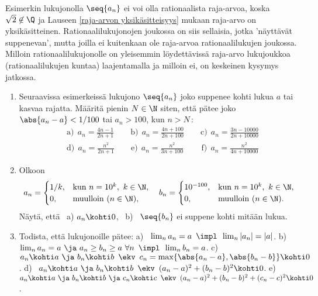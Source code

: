 Esimerkin lukujonolla $\seq{a_n}$ ei voi olla rationaalista raja-arvoa, koska 
$\sqrt{2}\not\in\Q$ ja Lauseen \ref{raja-arvon yksikäsitteisyys} mukaan raja-arvo on
yksikäsitteinen. Rationaalilukujonojen joukossa on siis sellaisia, jotka 
'näyttävät suppenevan', mutta joilla ei kuitenkaan ole raja-arvoa rationaalilukujen
joukossa. Milloin rationaalilukujonolle on yleisemmin löydettävissä raja-arvo 
lukujoukkoa (rationaalilukujen kuntaa) laajentamalla ja milloin ei, on keskeinen kysymys
jatkossa.

\Harj
\begin{enumerate}

\item
Seuraavissa esimerkeissä lukujono $\seq{a_n}$ joko suppenee kohti lukua $a$ tai kasvaa
rajatta. Määritä pienin $N\in\N$ siten, että pätee joko $\abs{a_n-a}<1/100$ tai $a_n>100$,
kun $n>N$\,:
\begin{align*}
&\text{a)}\ \ a_n = \frac{4n-1}{2n+1} \qquad 
 \text{b)}\ \ a_n = \frac{4n+100}{2n+100} \qquad
 \text{c)}\ \ a_n = \frac{3n-10000}{2n+10000} \\
&\text{d)}\ \ a_n = \frac{n^2}{2n+1} \qquad 
 \text{e)}\ \ a_n = \frac{n^2}{3n+100} \qquad\,
 \text{f)}\ \ a_n = \frac{n^2}{4n+10000}
\end{align*}

\item
Olkoon
\[
a_n = \begin{cases} 1/k, &\text{kun}\ n=10^k,\ k\in\N, \\
                    0,   &\text{muulloin ($n\in\N$)},
      \end{cases} \quad
b_n = \begin{cases} 10^{-100}, &\text{kun}\ n=10^k,\ k\in\N, \\
                    0,         &\text{muulloin ($n\in\N$)}.
      \end{cases}
\]
Näytä, että \ a) $a_n \kohti 0$, \ b) \ $\seq{b_n}$ ei suppene kohti mitään lukua.

\item \label{H-I-6: lukujonopari}
Todista, että lukujonoille pätee: \vspace{1mm}\newline
a) \ $\lim_n a_n=a\,\ \impl\,\ \lim_n|a_n|=|a|$. \vspace{1mm}\newline
b) \ $\lim_n a_n=a\ \ja\ a_n \ge b_n \ge a\ \forall n\,\ \impl\,\ \lim_n b_n=a$.
\vspace{1mm}\newline
c) \ $a_n \kohti a\ \ja\ b_n \kohti b\,\ 
                    \ekv\,\ c_n=\max\{\abs{a_n-a},\abs{b_n-b}\} \kohti 0$. \vspace{1mm}\newline
d) \ $a_n \kohti a\ \ja\ b_n \kohti b\,\ 
                    \ekv\,\ (a_n-a)^2+(b_n-b)^2 \kohti 0$. \vspace{1mm}\newline
e) \ $a_n \kohti a\ \ja\ b_n \kohti b\ \ja\ c_n \kohti c\,\
                    \ekv\,\ (a_n-a)^2+(b_n-b)^2+(c_n-c)^2 \kohti 0$.


\end{enumerate}
